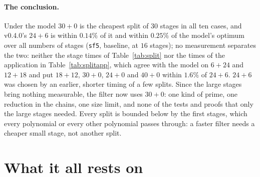 \documentclass[10pt,a4paper]{article}
\newcommand{\code}[1]{\texttt{#1}}
\theoremstyle{plain}
\theoremstyle{definition}
\begin{document}
\paragraph{The conclusion.}  Under the model $30+0$ is the cheapest split of $30$ stages in all ten cases, and v0.4.0's $24+6$ is within $0.14\%$ of it and
within $0.25\%$ of the model's optimum over all numbers of stages (\code{sf5}, baseline, at $16$ stages); no measurement separates the two: neither the stage times
of Table~\ref{tab:split} nor the times of the application in Table~\ref{tab:splitapp}, which agree with the model on $6+24$ and $12+18$ and put $18+12$, $30+0$,
$24+0$ and $40+0$ within $1.6\%$ of $24+6$.  $24+6$ was chosen by an earlier, shorter timing of a few splits.  Since the large stages bring nothing measurable,
the filter now uses $30+0$: one kind of prime, one reduction in the chains, one size limit, and none of the tests and proofs that only the large stages needed.
Every split is bounded below by the first stages, which every polynomial or every other polynomial passes through: a faster filter needs a cheaper small stage,
not another split.

\section{What it all rests on}\label{sec:ledger}
\end{document}
